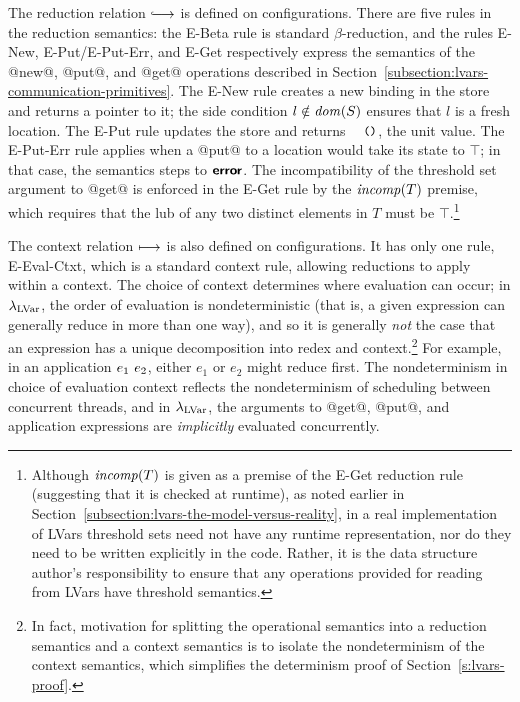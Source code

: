 The reduction relation $\parstepsto$ is defined on
configurations. There are five rules in the reduction semantics: the
{\sc E-Beta} rule is standard $\beta$-reduction, and the rules {\sc
  E-New}, {\sc E-Put}/{\sc E-Put-Err}, and {\sc E-Get} respectively
express the semantics of the @new@, @put@, and @get@ operations
described in Section~\ref{subsection:lvars-communication-primitives}.
The {\sc E-New} rule creates a new binding in the store and returns a
pointer to it; the side condition $l \notin \mathit{dom}(S)$ ensures that $l$
is a fresh location.  The {\sc E-Put} rule updates the store and
returns $\unit$, the unit value.  The {\sc E-Put-Err} rule applies
when a @put@ to a location would take its state to $\top$; in that
case, the semantics steps to $\textbf{\textsf{error}}$.  The incompatibility of the
threshold set argument to @get@ is enforced in the {\sc E-Get} rule by
the $\mathit{incomp}(T)$ premise, which requires that the lub of any two
distinct elements in $T$ must be $\top$.\footnote{Although
  $\mathit{incomp}(T)$ is given as a premise of the {\sc E-Get} reduction rule
  (suggesting that it is checked at runtime), as  noted earlier in
  Section~\ref{subsection:lvars-the-model-versus-reality}, in a real
  implementation of LVars threshold sets need not have any runtime
  representation, nor do they need to be written explicitly in the
  code.  Rather, it is the data structure author's responsibility to
  ensure that any operations provided for reading from LVars have
  threshold semantics.}

The context relation $\longmapsto$ is also defined on configurations.
It has only one rule, {\sc E-Eval-Ctxt}, which is a standard context
rule, allowing reductions to apply within a context.  The choice of
context determines where evaluation can occur; in $\lambda_{\textrm{LVar}}$, the
order of evaluation is nondeterministic (that is, a given expression
can generally reduce in more than one way), and so it is generally
\emph{not} the case that an expression has a unique decomposition into
redex and context.\footnote{In fact,  motivation for splitting the
  operational semantics into a reduction semantics and a context
  semantics is to isolate the nondeterminism of the context semantics,
  which simplifies the determinism proof of
  Section~\ref{s:lvars-proof}.}  For example, in an application
$e_1~e_2$, either $e_1$ or $e_2$ might reduce first.  The
nondeterminism in choice of evaluation context reflects the
nondeterminism of scheduling between concurrent threads, and in
$\lambda_{\textrm{LVar}}$, the arguments to @get@, @put@, and application
expressions are \emph{implicitly} evaluated concurrently.

